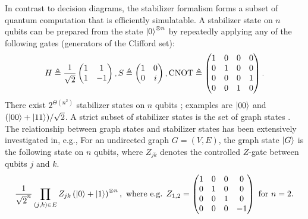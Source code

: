 In contrast to decision diagrams, the stabilizer formalism forms a subset of quantum computation that is efficiently simulatable.
A stabilizer state on $n$ qubits can be prepared from the state $\ket{0}^{\otimes n}$ by repeatedly applying any of the following gates (generators of the Clifford set):
\begin{equation}
    H \triangleq 
        \frac{1}{\sqrt{2}}
        \begin{pmatrix} 1 & 1\\ 1 & -1 \end{pmatrix}
            ,
        S
        \triangleq
        \begin{pmatrix} 1 & 0\\ 0 & i \end{pmatrix},
            \textnormal{CNOT} \triangleq 
        \begin{pmatrix}
            1 & 0 & 0 & 0\\
            0 & 1 & 0 & 0\\
            0 & 0 & 0 & 1\\
            0 & 0 & 1 & 0
        \end{pmatrix}.
        \label{eq:clifford-generators}
\end{equation}
There exist $2^{\Theta(n^2)}$ stabilizer states on $n$ qubits \cite{aaronson2008improved}; examples are $\ket{00}$ and $(\ket{00} + \ket{11}) / \sqrt{2}$.
A strict subset of stabilizer states is the set of graph states \cite{hein2006entanglement}.
The relationship between graph states and stabilizer states has been extensively investigated in, e.g., \cite{nest2004graphical,nest2005local}
For an undirected graph $G=(V,E)$, the graph state $\ket{G}$ is the following state on $n$ qubits, where $Z_{jk}$ denotes the controlled $Z$-gate between qubits $j$ and $k$.
\begin{equation}
    \frac{1}{\sqrt{2}^n} \prod_{(j, k) \in E} Z_{jk} \left(\ket{0} + \ket{1}\right)^{\otimes n}, \text{ where e.g. }
        Z_{1,2} = 
        \begin{pmatrix}
            1 & 0 & 0 & 0\\
            0 & 1 & 0 & 0\\
            0 & 0 & 1 & 0\\
            0 & 0 & 0 & -1
        \end{pmatrix} \text{ for } n=2.
	\label{eq:graph-state-definition}
\end{equation}
